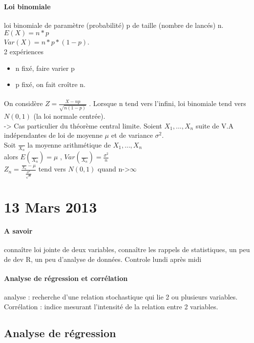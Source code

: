 \documentclass{article}
\begin{document}
\paragraph{Loi binomiale} loi binomiale de paramètre (probabilité) p de taille (nombre de lancés) n.\\$E(X) = n*p$\\$Var(X) = n*p*(1-p)$.\\ 2 expériences 
\begin{itemize}
\item n fixé, faire varier p
\item p fixé, on fait croître n.
\end{itemize}

\paragraph{} On considère $Z= \frac{X-np}{\sqrt{n(1-p)}}$ . Lorsque n tend vers l'infini, loi binomiale tend vers $N(0,1)$ (la loi normale centrée).\\-> Cas particulier du théorème central limite. Soient $X_1,...,X_n$ suite de V.A indépendantes de loi de moyenne $\mu$ et de variance $\sigma^2$.\\Soit $\frac{}{X_n}$ la moyenne arithmétique de $X_1,...,X_n$ \\alors $E(\frac{}{X_n}) = \mu$ , $Var(\frac{}{X_n}) = \frac{\sigma^2}{n}$ \\ $Z_n = \frac{\frac{}{X_n} - \mu}{\frac{\sigma^2}{\sqrt{n}}}$ tend vers $N(0,1)$ quand n->$\infty$

\section{13 Mars 2013}
\paragraph{A savoir} connaître loi jointe de deux variables, connaître les rappels de statistiques, un peu de dev R, un peu d'analyse de données. Controle lundi après midi

\paragraph{Analyse de régression et corrélation} analyse : recherche d'une relation stochastique qui lie 2 ou plusieurs variables. Corrélation : indice mesurant l'intensité de la relation entre 2 variables.

\subsection{Analyse de régression}
\end{document}
